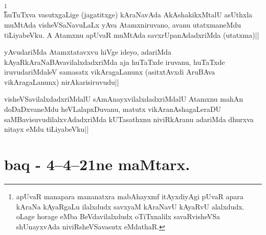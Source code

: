 
\begin{artha} 
\footnote[2]{apUvaR manapara mananatxra mabAhayxmf itAyxdiyAgi pUvaR 
apara kAraNa kAyaRgaLu ilalxdudx savxyaM kAraNavU kAyaRvU alalxdudx. 
oLage horage eMba BeVdavilalxdudx oTiTxnalilx savaRvisheVSa 
shUnayxvAda niviRsheVSavasutx eMdathaR.}\\
huTuTxva vasutxgaLige (jagatitxge) kAraNavAda AkAshakikxMtalU asUthxla 
muMtAda visheVSaNavuLaLx yAva Atamxniruvano, avanu utatxmaneMdu 
tiLiyabeVku. A Atamxnu apUvaR muMtAda savxrUpanAdadxriMda (utatxma)||
\end{artha}


\begin{artha} 
yAvudariMda Atamxtatavxvu hiVge ideyo, adariMda 
kAyaRkAraNaBAvavilalxdadxriMda aja huTaTxde iruvanu, huTaTxde 
iruvudariMdaleV samasatx vikAragaLanunx (asitxtAvxdi AruBAva 
vikAragaLanunx) nirAkarisiruvudu||
\end{artha}

\begin{artha} 
visheVSavilalxdadxriMdalU sAmAnayxvilalxdadxriMdalU Atamxnu mahAn 
doDaDxvaneMdu heVLalapxDuvanu, matutx vikAranAshagaLeraDU 
saMBavisuvudilalxvAdadxriMda kUTasathxnu niviRkAranu adariMda dhurxva 
nitayx eMdu tiLiyabeVku||
\end{artha}

\section*{baq - 4--4--21ne maMtarx. \stext}


